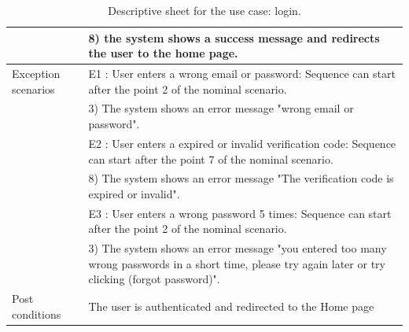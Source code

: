 \documentclass[]{uc2pfecaneva}
\begin{document}
\begin{table}[h]
\begin{tabularx}{\textwidth}{|l|X|}
            & \hspace{4mm}8) the system shows a success message and redirects the user to the home page.                                                                         \\ \hline
            Exception scenarios
            & E1 : User enters a wrong email or password: Sequence can start after the point 2 of the nominal scenario.                                                            \\
            & \hspace{4mm}3) The system shows an error message "wrong email or password".                                                                                        \\
            & E2 : User enters a expired or invalid verification code: Sequence can start after the point 7 of the nominal scenario.                                               \\
            & \hspace{4mm}8) The system shows an error message "The verification code is expired or invalid".                                                                    \\
            & E3 : User enters a wrong password 5 times: Sequence can start after the point 2 of the nominal scenario.                                                             \\
            & \hspace{4mm}3) The system shows an error message "you entered too many wrong passwords in a short time, please try again later or try clicking (forgot password)". \\
            Post conditions
            & The user is authenticated and redirected to the Home page                                                                                                            \\ \hline
        \end{tabularx}
        \caption{Descriptive sheet for the use case: login.}
        \label{table:1}
    \end{table}
    \clearpage
\end{document}
